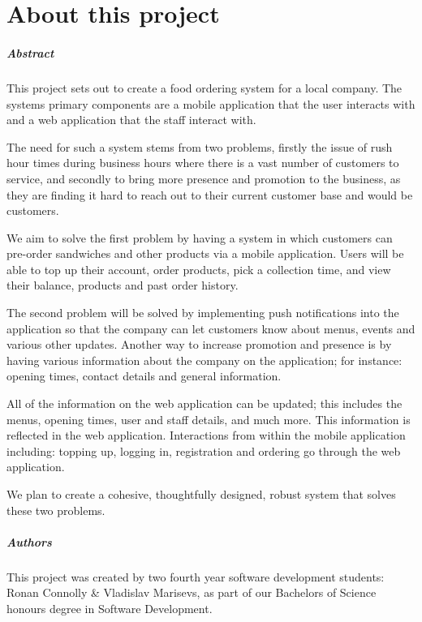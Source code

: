 
\chapter*{About this project}
\paragraph{Abstract}

This project sets out to create a food ordering system for a local company. 
The systems primary components are a mobile application that the user interacts with and a web application that the staff interact with.

The need for such a system stems from two problems, firstly the issue of rush hour times during business hours where there is a vast number of customers to service, and secondly to bring more presence and promotion to the business, as they are finding it hard to reach out to their current customer base and would be customers.

We aim to solve the first problem by having a system in which customers can pre-order sandwiches and other products via a mobile application.
Users will be able to top up their account, order products, pick a collection time, and view their balance, products and past order history.

The second problem will be solved by implementing push notifications into the application so that the company can let customers know about menus, events and various other updates. Another way to increase promotion and presence is by having various information about the company on the application; for instance: opening times, contact details and general information. 

All of the information on the web application can be updated; this includes the menus, opening times, user and staff details, and much more. 
This information is reflected in the web application.
Interactions from within the mobile application including: topping up, logging in, registration and ordering go through the web application.

We plan to create a cohesive, thoughtfully designed, robust system that solves these two problems.
\pagebreak


\paragraph{Authors}
This project was created by two fourth year software development students: Ronan Connolly \& Vladislav Marisevs, as part of our Bachelors of Science honours degree in Software Development.
\\

